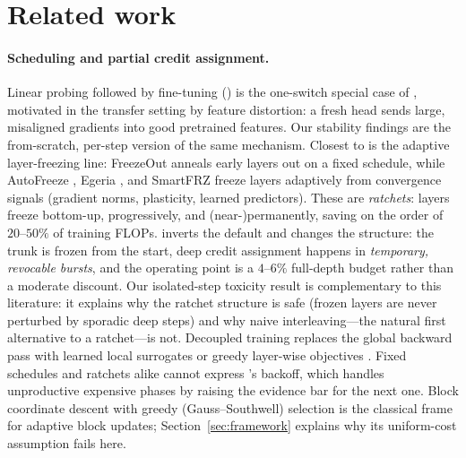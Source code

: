 \section{Related work}

\paragraph{Scheduling and partial credit assignment.} Linear probing
followed by fine-tuning (\lpft{}) \citep{kumar2022finetuning} is the
one-switch special case of \fw{}, motivated in the transfer setting by
feature distortion: a fresh head sends large, misaligned gradients into good
pretrained features. Our stability findings are the from-scratch, per-step
version of the same mechanism. Closest to \fw{} is the adaptive
layer-freezing line: FreezeOut \citep{brock2017freezeout} anneals early
layers out on a fixed schedule, while AutoFreeze \citep{liu2021autofreeze},
Egeria \citep{wang2023egeria}, and SmartFRZ \citep{li2023smartfrz} freeze
layers adaptively from convergence signals (gradient norms, plasticity,
learned predictors). These are \emph{ratchets}: layers freeze bottom-up,
progressively, and (near-)permanently, saving on the order of
$20$--$50\%$ of training FLOPs. \fw{} inverts the default and changes the
structure: the trunk is frozen from the start, deep credit assignment
happens in \emph{temporary, revocable bursts}, and the operating point is a
$4$--$6\%$ full-depth budget rather than a moderate discount. Our
isolated-step toxicity result is complementary to this literature: it
explains why the ratchet structure is safe (frozen layers are never
perturbed by sporadic deep steps) and why naive interleaving---the natural
first alternative to a ratchet---is not. Decoupled training replaces the
global backward pass with learned local surrogates
\citep{jaderberg2017decoupled} or greedy layer-wise objectives
\citep{belilovsky2019greedy}. Fixed schedules and ratchets alike cannot
express \fw{}'s backoff, which handles unproductive expensive phases by
raising the evidence bar for the next one. Block
coordinate descent with greedy (Gauss--Southwell) selection
\citep{nutini2015coordinate} is the classical frame for adaptive block
updates; Section~\ref{sec:framework} explains why its uniform-cost
assumption fails here.

